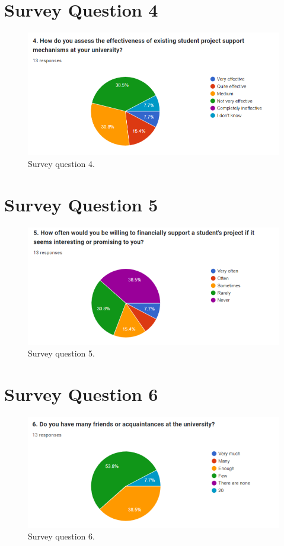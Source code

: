 \section{Survey Question 4}\label{survqa4}
\begin{figure}[H]\label{fig:survey4}
  \centering
  \includegraphics[width=0.8\linewidth]{figures/Survey question 4.png}
  \caption{Survey question 4.}
\end{figure}
\section{Survey Question 5}\label{survqa5}
\begin{figure}[H]\label{fig:survey5}
  \centering
  \includegraphics[width=0.8\linewidth]{figures/Survey question 5.png}
  \caption{Survey question 5.}
\end{figure}
\section{Survey Question 6}\label{survqa6}
\begin{figure}[H]\label{fig:survey6}
  \centering
  \includegraphics[width=0.8\linewidth]{figures/Survey question 6.png}
  \caption{Survey question 6.}
\end{figure}
